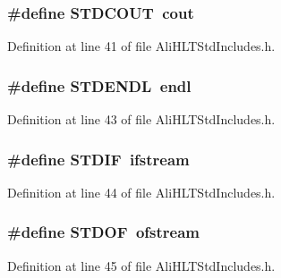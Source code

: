 \subsubsection{\setlength{\rightskip}{0pt plus 5cm}\#define STDCOUT\ cout}\label{AliHLTStdIncludes_8h_a0}




Definition at line 41 of file Ali\-HLTStd\-Includes.h.
\subsubsection{\setlength{\rightskip}{0pt plus 5cm}\#define STDENDL\ endl}\label{AliHLTStdIncludes_8h_a2}




Definition at line 43 of file Ali\-HLTStd\-Includes.h.
\subsubsection{\setlength{\rightskip}{0pt plus 5cm}\#define STDIF\ ifstream}\label{AliHLTStdIncludes_8h_a3}




Definition at line 44 of file Ali\-HLTStd\-Includes.h.
\subsubsection{\setlength{\rightskip}{0pt plus 5cm}\#define STDOF\ ofstream}\label{AliHLTStdIncludes_8h_a4}




Definition at line 45 of file Ali\-HLTStd\-Includes.h.